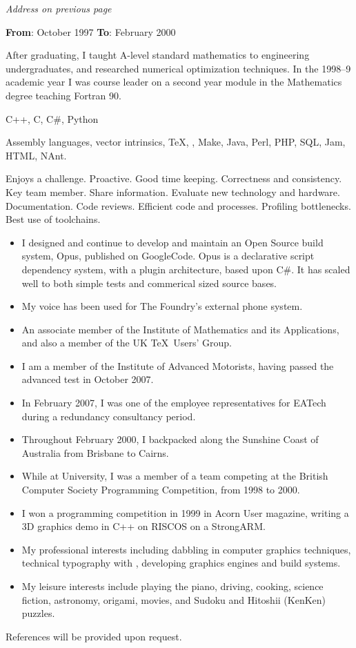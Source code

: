 \documentclass[a4paper,12pt]{article}
\newcommand{\cvheading}[1]{{\medskip\noindent\hspace{-5mm}{\sc #1}\par}}
\newcommand{\place}[2]{\vspace*{1ex}{\noindent\bf #1}\hfill{\it #2}\par}
\newcommand{\fromto}[2]{{\bf From}: #1 {\bf To}: #2\par}
\begin{document}
\place{University of Hertfordshire}{Address on previous page}
\fromto{October 1997}{February 2000}
After graduating, I taught A-level standard mathematics to engineering undergraduates, and researched numerical optimization techniques. In the 1998--9 academic year I was course leader on a second year module in the Mathematics degree teaching Fortran 90.

\pagebreak

\cvheading{Main programming languages}
C++, C, C\#, Python

\cvheading{Additional language experiences}
Assembly languages, vector intrinsics, \TeX, \LaTeXe, Make, Java, Perl, PHP, SQL, Jam, HTML, NAnt.

\cvheading{Key skills}
Enjoys a challenge. Proactive. Good time keeping. Correctness and consistency. Key team member. Share information. Evaluate new technology and hardware. Documentation. Code reviews. Efficient code and processes. Profiling bottlenecks. Best use of toolchains.

\cvheading{Interests, Responsibilities and Notable Achievements}
\begin{itemize}
\item I designed and continue to develop and maintain an Open Source build system, Opus, published on GoogleCode. Opus is a declarative script dependency system, with a plugin architecture, based upon C\#. It has scaled well to both simple tests and commerical sized source bases.
\item My voice has been used for The Foundry's external phone system.
\item An associate member of the Institute of Mathematics and its Applications, and also a member of the UK \TeX\ Users' Group.
\item I am a member of the Institute of Advanced Motorists, having passed the advanced test in October 2007.
\item In February 2007, I was one of the employee representatives for EATech during a redundancy consultancy period.
\item Throughout February 2000, I backpacked along the Sunshine Coast of Australia from Brisbane to Cairns.
\item While at University, I was a member of a team competing at the British Computer Society Programming Competition, from 1998 to 2000.
\item I won a programming competition in 1999 in Acorn User magazine, writing a 3D graphics demo in C++ on RISCOS on a StrongARM.
\item My professional interests including dabbling in computer graphics techniques, technical typography with \LaTeXe, developing graphics engines and build systems.
\item My leisure interests include playing the piano, driving, cooking, science fiction, astronomy, origami, movies, and Sudoku and Hitoshii (KenKen) puzzles.
\end{itemize}

\cvheading{References}
References will be provided upon request.
\end{document}
